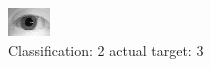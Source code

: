 \begin{figure}[h!]
\begin{center}
\includegraphics[width=0.60\columnwidth]{figures/ID1043_class_2_target_3.png}
\end{center}
\caption{ Classification: 2 actual target: 3}
\label{fig:ID1043_class_2_target_3}
\end{figure}
